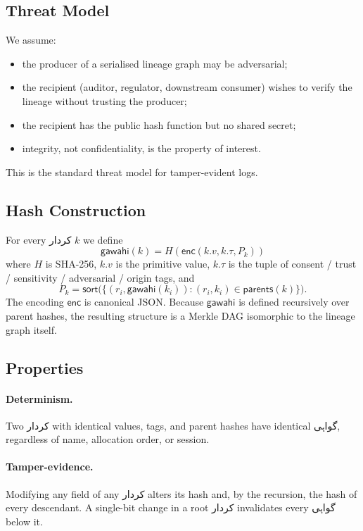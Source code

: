 \documentclass[10pt,twocolumn]{article}
\newcommand{\ur}[1]{{\urdufont #1}}
\begin{document}
\subsection{Threat Model}

We assume:
\begin{itemize}
\item the producer of a serialised lineage graph may be adversarial;
\item the recipient (auditor, regulator, downstream consumer) wishes to verify the lineage without trusting the producer;
\item the recipient has the public hash function but no shared secret;
\item integrity, not confidentiality, is the property of interest.
\end{itemize}
This is the standard threat model for tamper-evident logs.

\subsection{Hash Construction}

For every \ur{کردار} $k$ we define
\[
\mathsf{gawahi}(k) = H\!\left( \mathsf{enc}(k.v, k.\tau, P_k) \right)
\]
where $H$ is SHA-256, $k.v$ is the primitive value, $k.\tau$ is the tuple of consent / trust / sensitivity / adversarial / origin tags, and
\[
P_k = \mathsf{sort}\bigl( \{(r_i, \mathsf{gawahi}(k_i)) : (r_i, k_i) \in \mathsf{parents}(k)\} \bigr).
\]
The encoding $\mathsf{enc}$ is canonical JSON. Because $\mathsf{gawahi}$ is defined recursively over parent hashes, the resulting structure is a Merkle DAG isomorphic to the lineage graph itself.

\subsection{Properties}

\paragraph{Determinism.} Two \ur{کردار} with identical values, tags, and parent hashes have identical \ur{گواہی}, regardless of name, allocation order, or session.

\paragraph{Tamper-evidence.} Modifying any field of any \ur{کردار} alters its hash and, by the recursion, the hash of every descendant. A single-bit change in a root \ur{کردار} invalidates every \ur{گواہی} below it.
\end{document}
